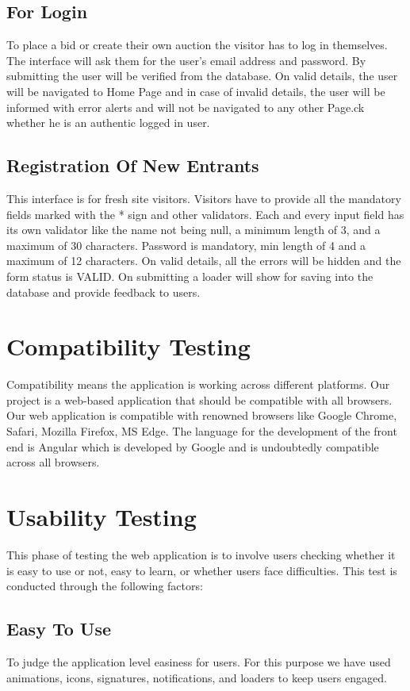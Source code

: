 \subsection{For Login}
\doublespacing
To place a bid or create their own auction the visitor has to log in themselves. The interface will ask them for the user's email address and password. By submitting the user will be verified from the database. On valid details, the user will be navigated to Home Page and in case of invalid details, the user will be informed with error alerts and will not be navigated to any other Page.ck whether he is an authentic logged in user.
\subsection{Registration Of New Entrants}
\doublespacing
This interface is for fresh site visitors. Visitors have to provide all the mandatory fields marked with the * sign and other validators. Each and every input field has its own validator like the name not being null, a minimum length of 3, and a maximum of 30 characters. Password is mandatory, min length of 4 and a maximum of 12 characters. On valid details, all the errors will be hidden and the form status is VALID. On submitting a loader will show for saving into the database and provide feedback to users.
\section{Compatibility Testing}
\doublespacing
Compatibility means the application is working across different platforms. Our project is a web-based application that should be compatible with all browsers. Our web application is compatible with renowned browsers like Google Chrome, Safari, Mozilla Firefox, MS Edge. The language for the development of the front end is Angular which is developed by Google and is undoubtedly compatible across all browsers.

\section{Usability Testing}
\doublespacing
This phase of testing the web application is to involve users checking whether it is easy to use or not, easy to learn, or whether users face difficulties. This test is conducted through the following factors:
\subsection{Easy To Use}
To judge the application level easiness for users. For this purpose we have used animations, icons, signatures, notifications, and loaders to keep users engaged.
